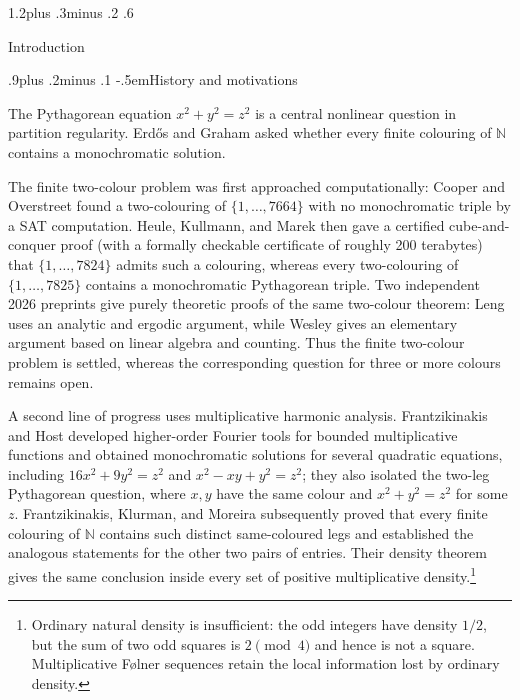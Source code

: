 \documentclass[twoside]{aomart}
\makeatletter
\theoremstyle{paperplain}
\theoremstyle{paperdefinition}
\renewcommand\section{\@startsection{section}{1}{\z@}
  {1.2\baselineskip plus .3\baselineskip minus .2\baselineskip}
  {.6\baselineskip}{\normalfont\large\bfseries\raggedright}}
\renewcommand\subsection{\@startsection{subsection}{2}{\z@}
  {.9\baselineskip plus .2\baselineskip minus .1\baselineskip}
  {-.5em}{\normalfont\bfseries}}
\newcommand{\N}{\mathbb N}
\numberwithin{equation}{section}
\makeatother
\begin{document}
\section{Introduction}
\label{sec:introduction}

\subsection{History and motivations}

The Pythagorean equation $x^2+y^2=z^2$ is a central nonlinear question
in partition regularity.  Erd\H{o}s and
Graham \cite[Section~3, Problem~6]{GrahamFavorite} asked whether every
finite colouring of $\N$ contains a monochromatic solution.  

The finite two-colour
problem was first approached computationally: Cooper and Overstreet
\cite{CooperOverstreet} found a two-colouring of
$\{1,\ldots,7664\}$ with no monochromatic triple by a SAT computation.
Heule, Kullmann, and Marek \cite[Theorem~1]{HeuleKullmannMarek} then gave
a certified cube-and-conquer proof (with a formally checkable certificate
of roughly 200 terabytes) that $\{1,\ldots,7824\}$ admits such a colouring,
whereas every two-colouring of $\{1,\ldots,7825\}$ contains a
monochromatic Pythagorean triple.  Two independent 2026 preprints give
purely theoretic proofs of the same two-colour theorem: Leng \cite{Leng2026} uses an
analytic and ergodic argument, while Wesley \cite{Wesley2026} gives an
elementary argument based on linear algebra and counting.  Thus the
finite two-colour problem is settled, whereas the corresponding question
for three or more colours remains open.

A second line of progress uses multiplicative harmonic analysis.
Frantzikinakis and Host \cite[Corollary~2.8 and Problem~3]{FrantzikinakisHost}
developed higher-order Fourier tools for bounded multiplicative functions
and obtained monochromatic solutions for several quadratic equations,
including $16x^2+9y^2=z^2$ and $x^2-xy+y^2=z^2$; they also isolated the
two-leg Pythagorean question, where $x,y$ have the same colour and
$x^2+y^2=z^2$ for some $z$.  Frantzikinakis, Klurman, and Moreira
\cite[Theorems~1.1--1.2]{FKM} subsequently proved that every finite
colouring of $\N$ contains such distinct same-coloured legs and established
the analogous statements for the other two pairs of entries.  Their
density theorem gives the same conclusion inside every set of positive
multiplicative density.\footnote{Ordinary natural density is insufficient: the
odd integers have density $1/2$, but the sum of two odd squares is
$2\pmod 4$ and hence is not a square.  Multiplicative F\o lner sequences
retain the local information lost by ordinary density.}
\end{document}
